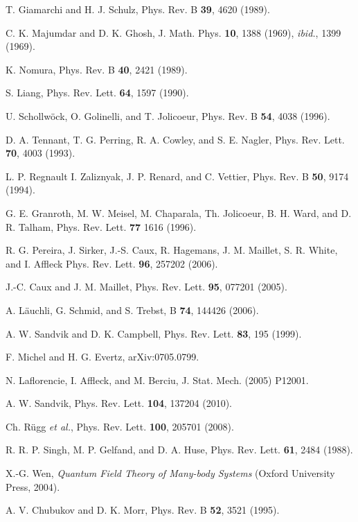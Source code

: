 \documentclass[draft,numberedheadings]{aipproc}
\begin{document}
\begin{thebibliography}{999}
T. Giamarchi and H. J. Schulz, Phys. Rev. B {\bf 39}, 4620 (1989).

C. K. Majumdar and D. K. Ghosh, J. Math. Phys. {\bf 10}, 1388 (1969), {\it ibid.}, 1399 (1969).

K. Nomura, Phys. Rev. B {\bf 40}, 2421 (1989).

S. Liang, Phys. Rev. Lett. {\bf 64}, 1597 (1990).

U. Schollw\"ock, O. Golinelli, and T. Jolicoeur, Phys. Rev. B {\bf 54}, 4038 (1996).

D. A. Tennant, T. G. Perring, R. A. Cowley, and S. E. Nagler, 
Phys. Rev. Lett. {\bf 70}, 4003 (1993).

L. P. Regnault I. Zaliznyak, J. P. Renard, and C. Vettier,
Phys. Rev. B {\bf 50}, 9174 (1994).

G. E. Granroth, M. W. Meisel, M. Chaparala, Th. Jolicoeur, B. H. Ward, and D. R. Talham,
Phys. Rev. Lett. {\bf 77} 1616 (1996).

R. G. Pereira, J. Sirker, J.-S. Caux, R. Hagemans, J. M. Maillet, S. R. White, and I. Affleck
Phys. Rev. Lett. {\bf 96}, 257202 (2006).

J.-C. Caux and J. M. Maillet, Phys. Rev. Lett. {\bf 95}, 077201 (2005).

A. L\"auchli, G. Schmid, and S. Trebst, B {\bf 74}, 144426 (2006).

A. W. Sandvik and D. K. Campbell, Phys. Rev. Lett. {\bf 83}, 195 (1999).

F. Michel and H. G. Evertz, arXiv:0705.0799.

N. Laflorencie, I. Affleck, and M. Berciu, J. Stat. Mech. (2005) P12001.

A. W. Sandvik, Phys. Rev. Lett. {\bf 104}, 137204 (2010).

Ch. R\"ugg {\it et al.}, Phys. Rev. Lett. {\bf 100}, 205701 (2008).

R. R. P. Singh, M. P. Gelfand, and D. A. Huse, Phys. Rev. Lett. {\bf 61}, 2484 (1988).

X.-G. Wen, {\it Quantum Field Theory of Many-body Systems} (Oxford University Press, 2004).

A. V. Chubukov and D. K. Morr, Phys. Rev. B {\bf 52}, 3521 (1995). 


\end{thebibliography}
\end{document}
